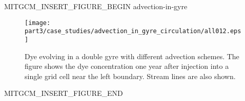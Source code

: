 \begin{rawhtml}MITGCM_INSERT_FIGURE_BEGIN advection-in-gyre\end{rawhtml}
\begin{figure}
\begin{center}
 \texttt{[image: part3/case\_studies/advection\_in\_gyre\_circulation/all012.eps]}
\end{center}
\caption{Dye evolving in a double gyre with different advection schemes.  The figure shows the
dye concentration one year after injection into a single grid cell near the left boundary.
Stream lines are also shown.}
\label{fig:adv-gyre-all}
\end{figure}
\begin{rawhtml}MITGCM_INSERT_FIGURE_END\end{rawhtml}
